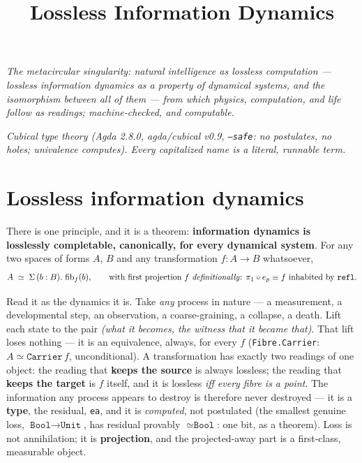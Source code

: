 \documentclass[11pt]{article}
\title{Lossless Information Dynamics}
\author{}
\date{}
\newcommand{\tm}[1]{\texttt{#1}}
\begin{document}
\maketitle

\begin{center}\itshape
The metacircular singularity: natural intelligence as lossless computation ---
lossless information dynamics as a property of dynamical systems, and the
isomorphism between all of them --- from which physics, computation, and life
follow as readings; machine-checked, and computable.
\end{center}

\medskip
\noindent\textit{Cubical type theory (Agda 2.8.0, agda/cubical v0.9,
\tm{--safe}: no postulates, no holes; univalence computes). Every capitalized
name is a literal, runnable term.}

\hrulefill

\section{Lossless information dynamics}

There is one principle, and it is a theorem: \textbf{information dynamics is
losslessly completable, canonically, for every dynamical system}. For any two
spaces of forms $A$, $B$ and any transformation $f : A \to B$ whatsoever,
\[
  A \;\simeq\; \Sigma\,(b : B).\ \mathrm{fib}_f(b),
  \qquad\text{with first projection } f \text{ \emph{definitionally}: }
  \pi_1 \circ e_p \equiv f \text{ inhabited by } \tm{refl}.
\]

Read it as the dynamics it is. Take \emph{any} process in nature --- a
measurement, a developmental step, an observation, a coarse-graining, a
collapse, a death. Lift each state to the pair \emph{(what it becomes, the
witness that it became that)}. That lift loses nothing --- it is an
equivalence, always, for every $f$ (\tm{Fibre.Carrier}: $A \simeq \tm{Carrier}\,f$,
unconditional). A transformation has exactly two readings of one object: the
reading that \textbf{keeps the source} is always lossless; the reading that
\textbf{keeps the target} is $f$ itself, and it is lossless \emph{iff every
fibre is a point}. The information any process appears to destroy is therefore
never destroyed --- it is a \textbf{type}, the residual, \tm{ea}, and it is
\emph{computed}, not postulated (the smallest genuine loss, $\tm{Bool} \to
\tm{Unit}$, has residual provably $\simeq \tm{Bool}$: one bit, as a theorem).
Loss is not annihilation; it is \textbf{projection}, and the projected-away
part is a first-class, measurable object.
\end{document}

